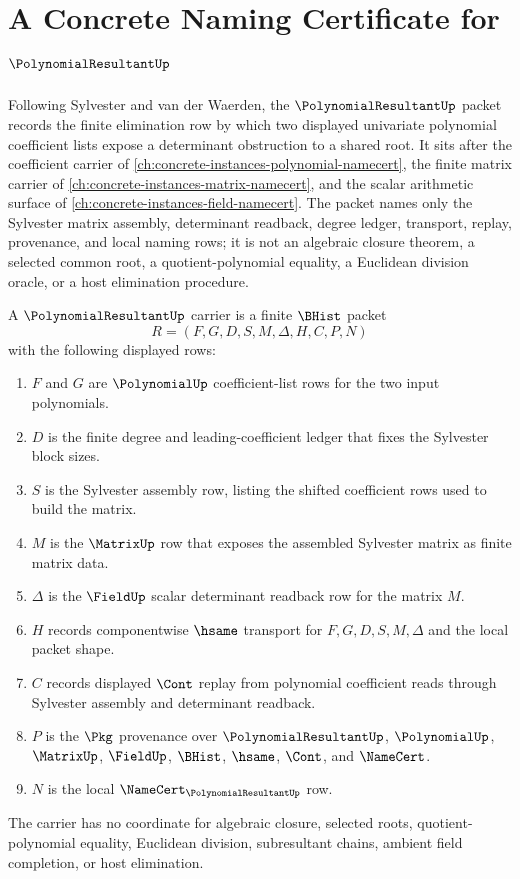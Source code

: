 \chapter{A Concrete Naming Certificate for $\PolynomialResultantUp$}
\label{ch:concrete-instances-polynomial-resultant-namecert}

Following Sylvester and van der Waerden, the $\PolynomialResultantUp$ packet records the finite elimination row by which two displayed univariate polynomial coefficient lists expose a determinant obstruction to a shared root. It sits after the coefficient carrier of \autoref{ch:concrete-instances-polynomial-namecert}, the finite matrix carrier of \autoref{ch:concrete-instances-matrix-namecert}, and the scalar arithmetic surface of \autoref{ch:concrete-instances-field-namecert}. The packet names only the Sylvester matrix assembly, determinant readback, degree ledger, transport, replay, provenance, and local naming rows; it is not an algebraic closure theorem, a selected common root, a quotient-polynomial equality, a Euclidean division oracle, or a host elimination procedure.

\begin{definition}
\label{def:polynomial-resultant-carrier}
A $\PolynomialResultantUp$ carrier is a finite $\BHist$ packet
$$
R=(F,G,D,S,M,\Delta,H,C,P,N)
$$
with the following displayed rows:
\begin{enumerate}
\item $F$ and $G$ are $\PolynomialUp$ coefficient-list rows for the two input polynomials.
\item $D$ is the finite degree and leading-coefficient ledger that fixes the Sylvester block sizes.
\item $S$ is the Sylvester assembly row, listing the shifted coefficient rows used to build the matrix.
\item $M$ is the $\MatrixUp$ row that exposes the assembled Sylvester matrix as finite matrix data.
\item $\Delta$ is the $\FieldUp$ scalar determinant readback row for the matrix $M$.
\item $H$ records componentwise $\hsame$ transport for $F,G,D,S,M,\Delta$ and the local packet shape.
\item $C$ records displayed $\Cont$ replay from polynomial coefficient reads through Sylvester assembly and determinant readback.
\item $P$ is the $\Pkg$ provenance over $\PolynomialResultantUp$, $\PolynomialUp$, $\MatrixUp$, $\FieldUp$, $\BHist$, $\hsame$, $\Cont$, and $\NameCert$.
\item $N$ is the local $\NameCert_{\PolynomialResultantUp}$ row.
\end{enumerate}
The carrier has no coordinate for algebraic closure, selected roots, quotient-polynomial equality, Euclidean division, subresultant chains, ambient field completion, or host elimination.
\end{definition}

